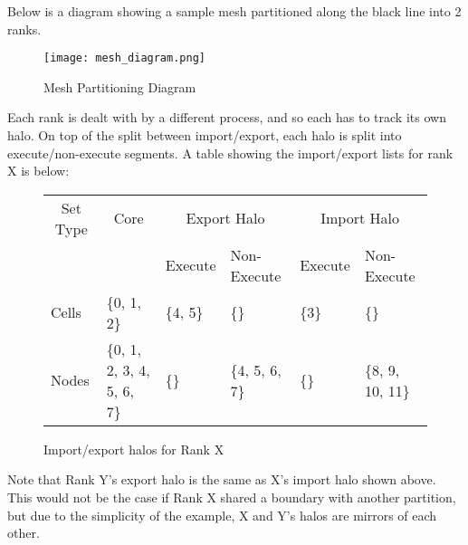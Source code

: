 Below is a diagram showing a sample mesh partitioned along the black line into 2 ranks. 
\begin{figure}[h!]
    \centering
    \texttt{[image: mesh\_diagram.png]}
    \caption{Mesh Partitioning Diagram \cite{mpi-dev}}
    \label{fig:mesh_partitioning}
\end{figure}
Each rank is dealt with by a different process, and so each has to track its own halo. On top of the split between import/export, each halo is split into execute/non-execute segments. A table showing the import/export lists for rank X is below:
\begin{figure*}
    \centering
    \begin{tabular}{|l|l||ll|ll|}
        \hline
        \multicolumn{1}{|c|}{Set Type} & \multicolumn{1}{c||}{Core} & \multicolumn{2}{c|}{Export Halo} & \multicolumn{2}{c|}{Import Halo} \\
                                      &                           & Execute       & Non-Execute      & Execute         & Non-Execute    \\ \hline
        Cells                          & \{0, 1, 2\}         & \{4, 5\}          & \{\}      & \{3\}            & \{\}    \\ \hline
        Nodes                          & \{0, 1, 2, 3, 4, 5, 6, 7\}         & \{\}         & \{4, 5, 6, 7\}             & \{\}     & \{8, 9, 10, 11\}           \\ \hline
    \end{tabular}
    \caption{Import/export halos for Rank X}
    \label{fig:Halo_set_example_table}
\end{figure*}
Note that Rank Y's export halo is the same as X's import halo shown above. This would not be the case if Rank X shared a boundary with another partition, but due to the simplicity of the example, X and Y's halos are mirrors of each other.

